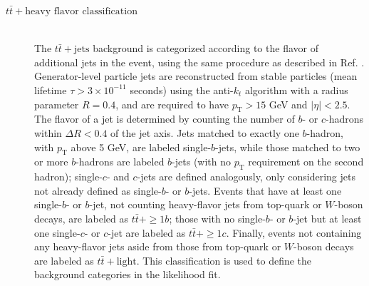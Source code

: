 \begin{description}
  \item[$t\bar{t}+\text{heavy flavor classification}$] \mbox{}\\
    The $t\bar{t}+\text{jets}$ background is categorized according to the flavor of additional jets in the event, using the same procedure as described in Ref. \cite{HIGG-2017-04}. Generator-level particle jets are reconstructed from stable particles (mean lifetime ${\tau}>3{\times}10^{-11}$ seconds) using the anti-$k_t$ algorithm with a radius parameter $R=0.4$, and are required to have $p_\text{T}>15$ GeV and $|\eta|<2.5$. The flavor of a jet is determined by counting the number of $b$- or $c$-hadrons within ${\Delta}R<0.4$ of the jet axis. Jets matched to exactly one $b$-hadron, with $p_\text{T}$ above 5 GeV, are labeled single-$b$-jets, while those matched to two or more $b$-hadrons are labeled $b$-jets (with no $p_\text{T}$ requirement on the second hadron); single-$c$- and $c$-jets are defined analogously, only considering jets not already defined as single-$b$- or $b$-jets. Events that have at least one single-$b$- or $b$-jet, not counting heavy-flavor jets from top-quark or $W$-boson decays, are labeled as $t\bar{t}+{\geq}1b$; those with no single-$b$- or $b$-jet but at least one single-$c$- or $c$-jet are labeled as $t\bar{t}+{\geq}1c$. Finally, events not containing any heavy-flavor jets aside from those from top-quark or $W$-boson decays are labeled as $t\bar{t}+\text{light}$. This classification is used to define the background categories in the likelihood fit.
    

\end{description}
